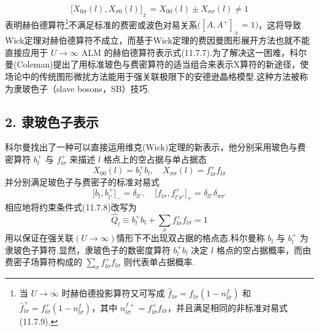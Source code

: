 \begin{equation}
  \bigl[X_{0\sigma}(l),X_{\sigma 0}(l)\bigr]_{\pm}=X_{00}(l)\pm X_{\sigma\sigma}(l)\neq 1
\end{equation}
表明赫伯德算符\footnote{当 $U\to\infty$ 时赫伯德投影算符又可写成
$\hat{f}_{l\sigma}=f_{l\sigma}(1-n_{l\bar{\sigma}}^{f})$ 和
$\hat{f}_{l\sigma}^{+}=f_{l\sigma}^{+}(1-n_{l\bar{\sigma}}^{f})$，其中
$n_{l\bar{\sigma}}^{f+}=f_{l\bar{\sigma}}^{+}f_{l\bar{\sigma}}$，并且满足相同的非标准对易式(11.7.9).}不满足标准的费密或波色对易关系$\bigl([A,A^{+}]_{\pm}=1\bigr)$，这将导致Wick定理对赫伯德算符不成立，而基于Wick定理的费因曼图形展开方法也就不能直接应用于 $U\to\infty$ ALM 的赫伯德算符表示式(11.7.7).为了解决这一困难，科尔曼(Coleman)提出了用标准玻色与费密算符的适当组合来表示X算符的新途径，使场论中的传统图形微扰方法能用于强关联极限下的安德逊晶格模型.这种方法被称为隶玻色子（slave bosons，SB）技巧.

\subsection*{2. 隶玻色子表示}

科尔曼找出了一种可以直接运用维克(Wick)定理的新表示，他分别采用玻色与费密算符 $b_{l}^{+}$ 与 $f_{l\sigma}^{+}$ 来描述 $l$ 格点上的空占据与单占据态
\begin{equation}
  X_{00}(l)=b_{l}^{+}b_{l},\quad X_{\sigma\sigma}(l)=f_{l\sigma}^{+}f_{l\sigma}
\end{equation}
并分别满足玻色子与费密子的标准对易式
\begin{equation}
  \bigl[b_{l},b_{l'}^{+}\bigr]_{-}=\delta_{ll'},\quad
  \bigl[f_{l\sigma},f_{l'\sigma'}^{+}\bigr]_{+}=\delta_{ll'}\delta_{\sigma\sigma'}
\end{equation}
相应地将约束条件式(11.7.8)改写为
\begin{equation}
  \hat{Q}_{l}\equiv b_{l}^{+}b_{l}+\sum_{\sigma}f_{l\sigma}^{+}f_{l\sigma}=1
\end{equation}
用以保证在强关联$(U\to\infty)$情形下不出现双占据的格点态.科尔曼称 $b_{l}$ 与 $b_{l}^{+}$ 为隶玻色子算符.显然，隶玻色子的数密度算符 $b_{l}^{+}b_{l}$ 决定 $l$ 格点的空占据概率，而由费密子场算符构成的 $\sum_{\sigma}f_{l\sigma}^{+}f_{l\sigma}$ 则代表单占据概率.


